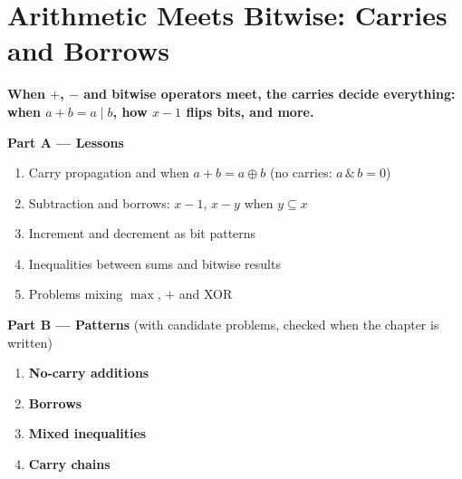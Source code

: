 \chapter{Arithmetic Meets Bitwise: Carries and Borrows}
\label{ch:carries}

\begin{tcolorbox}[enhanced, colback=white, colframe=secondaryblue, boxrule=1pt, arc=2mm]
\textbf{\large\textcolor{primaryblue}{When $+$, $-$ and bitwise operators meet, the carries decide everything: when $a + b = a \mid b$, how $x - 1$ flips bits, and more.}}
\end{tcolorbox}


\begin{plannedbox}
\textbf{Part A --- Lessons}
\begin{enumerate}[leftmargin=*, label=\textbf{A\arabic*.}, itemsep=1pt]
    \item Carry propagation and when $a + b = a \oplus b$ (no carries: $a \,\&\, b = 0$)
    \item Subtraction and borrows: $x - 1$, $x - y$ when $y \subseteq x$
    \item Increment and decrement as bit patterns
    \item Inequalities between sums and bitwise results
    \item Problems mixing $\max$, $+$ and XOR
\end{enumerate}
\textbf{Part B --- Patterns} (with candidate problems, checked when the chapter is written)
\begin{enumerate}[leftmargin=*, label=\textbf{P\arabic*.}, itemsep=1pt]
    \item \textbf{No-carry additions}
    \item \textbf{Borrows}
    \item \textbf{Mixed inequalities}
    \item \textbf{Carry chains}
\end{enumerate}
\end{plannedbox}
